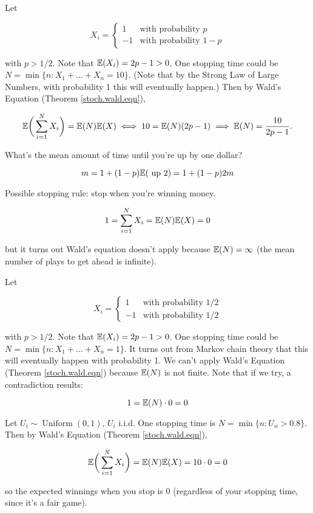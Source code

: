 \begin{example} Let

\[
X_i = \begin{cases}
1 & \text{with probability } p \\
-1 & \text{with probability } 1 -p
\end{cases}
\]

with \(p > 1/2\). Note that \(\mathbb{E}(X_i) = 2p - 1 > 0\). One stopping time could be \(N = \min\{n: X_1 + \ldots + X_n = 10\}\). (Note that by the Strong Law of Large Numbers, with probability 1 this will eventually happen.) Then by Wald's Equation (Theorem \ref{stoch.wald.eqn}),

\[
\mathbb{E} \bigg( \sum_{i=1}^N X_i \bigg) = \mathbb{E}(N) \mathbb{E}(X) \iff 10 = \mathbb{E}(N) (2p-1) \implies \mathbb{E}(N) = \frac{10}{2p-1}.
\]

What's the mean amount of time until you're up by one dollar?

\[
m = 1 + (1-p) \mathbb{E}( \text{ up } 2) = 1 + (1-p)2m
\]

Possible stopping rule: stop when you're winning money.

\[
1 = \sum_{i=1}^N X_i = \mathbb{E}(N) \mathbb{E}(X) =0
\]

but it turns out Wald's equation doesn't apply because \(\mathbb{E}(N) = \infty\) (the mean number of plays to get ahead is infinite).

\end{example}

\begin{example} Let

\[
X_i = \begin{cases}
1 & \text{with probability } 1/2 \\
-1 & \text{with probability } 1/2
\end{cases}
\]

with \(p > 1/2\). Note that \(\mathbb{E}(X_i) = 2p - 1 > 0\). One stopping time could be \(N = \min\{n: X_1 + \ldots + X_n = 1\}\). It turns out from Markov chain theory that this will eventually happen with probability 1. We can't apply Wald's Equation (Theorem \ref{stoch.wald.eqn}) because \(\mathbb{E}(N)\) is not finite. Note that if we try, a contradiction results:

\[
1 = \mathbb{E}(N) \cdot 0 = 0
\]

\end{example}

\begin{example} Let \(U_i \sim \operatorname{Uniform}(0,1)\), \(U_i\) i.i.d. One stopping time is \(N = \min\{n: U_n > 0.8\}\). Then by Wald's Equation (Theorem \ref{stoch.wald.eqn}),

\[
\mathbb{E} \bigg( \sum_{i=1}^N X_i \bigg) = \mathbb{E}(N) \mathbb{E}(X) = 10 \cdot 0 = 0
\]

so the expected winnings when you stop is 0 (regardless of your stopping time, since it's a fair game).


\end{example}

